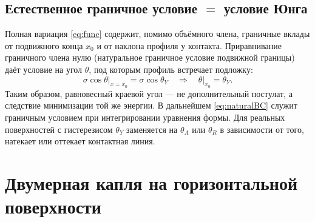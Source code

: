 \documentclass[11pt]{article}
\newcommand{\thA}{\theta_{A}}
\newcommand{\thR}{\theta_{R}}
\newcommand{\thY}{\theta_{Y}}
\theoremstyle{definition}
\begin{document}
\subsection{Естественное граничное условие $=$ условие Юнга}
Полная вариация \eqref{eq:func} содержит, помимо объёмного члена, граничные вклады
от подвижного конца $x_0$ и от наклона профиля у контакта. Приравнивание граничного
члена нулю (натуральное граничное условие подвижной границы) даёт условие на угол
$\theta$, под которым профиль встречает подложку:
\begin{equation}
\sigma\cos\theta\big|_{x=x_0}=\sigma\cos\thY
\quad\Longrightarrow\quad \theta\big|_{x_0}=\thY .
\label{eq:naturalBC}
\end{equation}
Таким образом, равновесный краевой угол --- не дополнительный постулат, а следствие
минимизации той же энергии. В дальнейшем \eqref{eq:naturalBC} служит граничным
условием при интегрировании уравнения формы. Для реальных поверхностей с
гистерезисом $\thY$ заменяется на $\thA$ или $\thR$ в зависимости от того,
натекает или оттекает контактная линия.

\section{Двумерная капля на горизонтальной поверхности}
\label{sec:2dhoriz}
\end{document}
